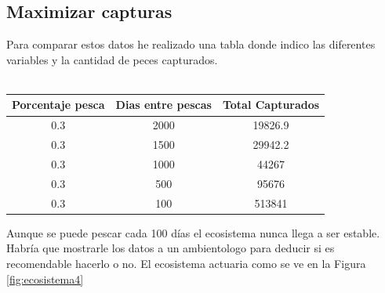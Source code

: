 \documentclass[12pt,a4paper]{article}
\begin{document}
\subsection{Maximizar capturas}
Para comparar estos datos he realizado una tabla donde indico las diferentes variables y la cantidad de peces capturados.\\\\
\begin{tabular}{|c|c|c|}
	\hline 
	\textbf{Porcentaje pesca} & \textbf{Dias entre pescas} & \textbf{Total Capturados} \\ 
	\hline 
	0.3& 2000 & 19826.9 \\
	0.3& 1500 & 29942.2 \\ 
	0.3& 1000 & 44267 \\
	0.3& 500 & 95676 \\
	0.3& 100 & 513841 \\
	\hline

\end{tabular} 
Aunque se puede pescar cada 100 días el ecosistema nunca llega a ser estable. Habría que mostrarle los datos a un ambientologo para deducir si es recomendable hacerlo o no. El ecosistema actuaria como se ve en la Figura \ref{fig:ecosistema4}
\end{document}
